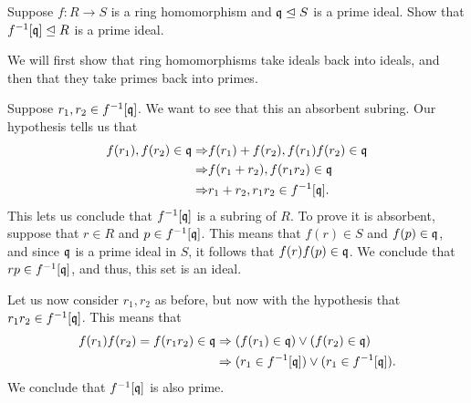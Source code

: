 \documentclass[12pt]{memoir}
\begin{document}
\begin{Ej}
  Suppose $f:R\to S$ is a ring homomorphism and $\mathfrak{q}\trianglelefteq S$ is a prime ideal. Show that $f^{-1}[\mathfrak{q}]\trianglelefteq R$ is a prime ideal.
\end{Ej}

\begin{ptcbr}
  We will first show that ring homomorphisms take ideals back into ideals, and then that they take primes back into primes.\par 
  Suppose $r_1,r_2\in f^{-1}[\mathfrak{q}]$. We want to see that this an absorbent subring. Our hypothesis tells us that 
  \begin{align*}
    f(r_1),f(r_2)\in\mathfrak{q}\Rightarrow&f(r_1)+f(r_2),f(r_1)f(r_2)\in\mathfrak{q}\\
    \Rightarrow&f(r_1+r_2),f(r_1r_2)\in\mathfrak{q}\\
    \Rightarrow&r_1+r_2,r_1r_2\in f^{-1}[\mathfrak{q}].
  \end{align*}
  This lets us conclude that $f^{-1}[\mathfrak{q}]$ is a subring of $R$. To prove it is absorbent, suppose that $r\in R$ and $p\in f^{-1}[\mathfrak{q}]$. This means that $f(r)\in S$ and $f(p)\in\mathfrak{q}$, and since $\mathfrak{q}$ is a prime ideal in $S$, it follows that $f(r)f(p)\in\mathfrak{q}$. We conclude that $rp\in f^{-1}[\mathfrak{q}]$, and thus, this set is an ideal.\par 
  Let us now consider $r_1,r_2$ as before, but now with the hypothesis that $r_1r_2\in f^{-1}[\mathfrak{q}]$. This means that 
  \begin{align*}
    f(r_1)f(r_2)=f(r_1r_2)\in\mathfrak{q}&\Rightarrow (f(r_1)\in\mathfrak{q})\lor(f(r_2)\in\mathfrak{q})\\
    &\Rightarrow(r_1\in f^{-1}[\mathfrak{q}])\lor(r_1\in f^{-1}[\mathfrak{q}]).
  \end{align*}
  We conclude that $f^{-1}[\mathfrak{q}]$ is also prime. 
\end{ptcbr}
\end{document}
